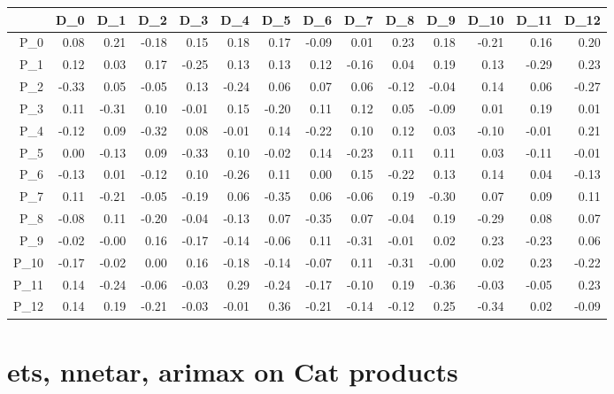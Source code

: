 \documentclass[10pt,a4paper]{article}\usepackage[]{graphicx}\usepackage[]{color}
\begin{document}
\begin{table}[ht]
\centering
\begin{tabular}{rrrrrrrrrrrrrr}
  \hline
 & D\_0 & D\_1 & D\_2 & D\_3 & D\_4 & D\_5 & D\_6 & D\_7 & D\_8 & D\_9 & D\_10 & D\_11 & D\_12 \\ 
  \hline
P\_0 & 0.08 & 0.21 & -0.18 & 0.15 & 0.18 & 0.17 & -0.09 & 0.01 & 0.23 & 0.18 & -0.21 & 0.16 & 0.20 \\ 
  P\_1 & 0.12 & 0.03 & 0.17 & -0.25 & 0.13 & 0.13 & 0.12 & -0.16 & 0.04 & 0.19 & 0.13 & -0.29 & 0.23 \\ 
  P\_2 & -0.33 & 0.05 & -0.05 & 0.13 & -0.24 & 0.06 & 0.07 & 0.06 & -0.12 & -0.04 & 0.14 & 0.06 & -0.27 \\ 
  P\_3 & 0.11 & -0.31 & 0.10 & -0.01 & 0.15 & -0.20 & 0.11 & 0.12 & 0.05 & -0.09 & 0.01 & 0.19 & 0.01 \\ 
  P\_4 & -0.12 & 0.09 & -0.32 & 0.08 & -0.01 & 0.14 & -0.22 & 0.10 & 0.12 & 0.03 & -0.10 & -0.01 & 0.21 \\ 
  P\_5 & 0.00 & -0.13 & 0.09 & -0.33 & 0.10 & -0.02 & 0.14 & -0.23 & 0.11 & 0.11 & 0.03 & -0.11 & -0.01 \\ 
  P\_6 & -0.13 & 0.01 & -0.12 & 0.10 & -0.26 & 0.11 & 0.00 & 0.15 & -0.22 & 0.13 & 0.14 & 0.04 & -0.13 \\ 
  P\_7 & 0.11 & -0.21 & -0.05 & -0.19 & 0.06 & -0.35 & 0.06 & -0.06 & 0.19 & -0.30 & 0.07 & 0.09 & 0.11 \\ 
  P\_8 & -0.08 & 0.11 & -0.20 & -0.04 & -0.13 & 0.07 & -0.35 & 0.07 & -0.04 & 0.19 & -0.29 & 0.08 & 0.07 \\ 
  P\_9 & -0.02 & -0.00 & 0.16 & -0.17 & -0.14 & -0.06 & 0.11 & -0.31 & -0.01 & 0.02 & 0.23 & -0.23 & 0.06 \\ 
  P\_10 & -0.17 & -0.02 & 0.00 & 0.16 & -0.18 & -0.14 & -0.07 & 0.11 & -0.31 & -0.00 & 0.02 & 0.23 & -0.22 \\ 
  P\_11 & 0.14 & -0.24 & -0.06 & -0.03 & 0.29 & -0.24 & -0.17 & -0.10 & 0.19 & -0.36 & -0.03 & -0.05 & 0.23 \\ 
  P\_12 & 0.14 & 0.19 & -0.21 & -0.03 & -0.01 & 0.36 & -0.21 & -0.14 & -0.12 & 0.25 & -0.34 & 0.02 & -0.09 \\ 
   \hline
\end{tabular}
\end{table}

\newpage



\section{ets, nnetar, arimax on Cat products}
\end{document}
